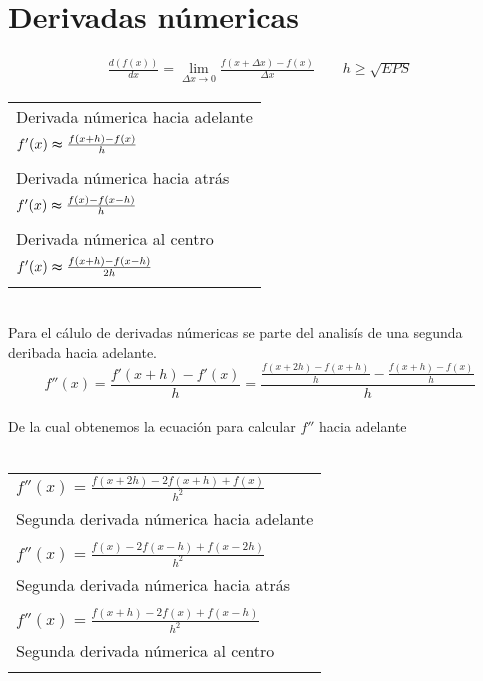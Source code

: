 \chapter{Derivadas n\'umericas}
\begin{center}
\begin{eqnarray}
\nonumber
\frac{d(f(x))}{dx}=\lim\limits_{\Delta x\to0}\frac{f(x+\Delta x)-f(x)}{\Delta x} \qquad\nonumber h\geq\sqrt{EPS}
\end{eqnarray}
\end{center}
\begin{tabular}{ l }
 Derivada n\'umerica hacia adelante \\
$f'(x)\thickapprox \frac{f(x+h)-f(x)}{h}$ \\
\\
 Derivada n\'umerica hacia atr\'as \\
$f'(x)\thickapprox \frac{f(x)-f(x-h)}{h}$ \\
\\
 Derivada n\'umerica al centro \\
$f'(x)\thickapprox \frac{f(x+h)-f(x-h)}{2h}$ \\
\\
\end{tabular}
\\
Para el c\'alulo de derivadas n\'umericas se parte del analis\'is de una segunda deribada hacia adelante.\\
\begin{displaymath}
f''(x)=\frac{f'(x+h)-f'(x)}{h}=\frac{\frac{f(x+2h)-f(x+h)}{h}-\frac{f(x+h)-f(x)}{h}}{h}
\end{displaymath} 
\\De la cual obtenemos la ecuaci\'on para calcular $f''$ hacia adelante\\ \\
\begin{tabular}{  l  }
$f''(x)=\frac{f(x+2h)-2f(x+h)+f(x)}{h^2}$ \\
Segunda derivada n\'umerica hacia adelante \\
\\
$f''(x)=\frac{f(x)-2f(x-h)+f(x-2h)}{h^2}$ \\
Segunda derivada n\'umerica hacia atr\'as \\
\\
$f''(x)=\frac{f(x+h)-2f(x)+f(x-h)}{h^2}$ \\
Segunda derivada n\'umerica al centro \\
\\
\end{tabular}
